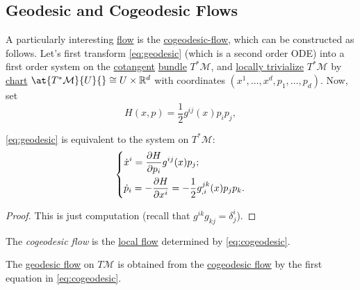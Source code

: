 \subsection{Geodesic and Cogeodesic Flows}
A particularly interesting \hyperref[def:local-flow]{flow} is the \hyperref[def:cogeodesic-flow]{cogeodesic-flow}, which can be constructed as follows. Let's first transform \autoref{eq:geodesic} (which is a second order ODE) into a first order system on the \hyperref[def:cotangent-space]{cotangent} \hyperref[def:vector-bundle]{bundle} \(T^{\ast} \mathcal{M} \), and \hyperref[def:local-trivialization]{locally trivialize} \(T^{\ast} \mathcal{M} \) by \hyperref[def:coordinate-chart]{chart} \(\at{T^{\ast} \mathcal{M} }{U}{} \cong U \times \mathbb{R} ^d\) with coordinates \((x^1, \dots , x^d, p_1, \dots , p_d)\). Now, set
\begin{equation}\label{eq:Hamilton}
	H(x, p) = \frac{1}{2} g^{ij} (x) p_i p_j,
\end{equation}

\begin{theorem}
	\autoref{eq:geodesic} is equivalent to the system on \(T^{\ast} \mathcal{M} \):
	\begin{equation}\label{eq:cogeodesic}
		\begin{dcases}
			\dot{x}^i = \frac{\partial H}{\partial p_i} g^{ij}(x) p_j; \\
			\dot{p}_i = -\frac{\partial H}{\partial x^i} = -\frac{1}{2} g^{jk}_{, i}(x)p_j p_k.
		\end{dcases}
	\end{equation}
\end{theorem}
\begin{proof}
	This is just computation (recall that \(g^{ik} g_{kj} = \delta ^i_j \)).
\end{proof}

\begin{definition}\label{def:cogeodesic-flow}
	The \emph{cogeodesic flow} is the \hyperref[def:local-flow]{local flow} determined by \autoref{eq:cogeodesic}.
\end{definition}

\begin{definition}\label{def:geodesic-flow}
	The \hyperref[def:geodesic-flow]{geodesic flow} on \(T\mathcal{M} \) is obtained from the \hyperref[def:cogeodesic-flow]{cogeodesic flow} by the first equation in \autoref{eq:cogeodesic}.
\end{definition}

